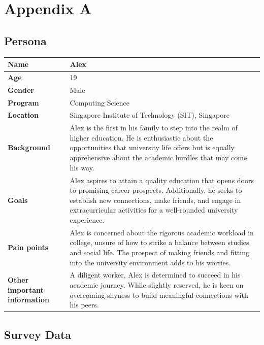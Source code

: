 \chapter{Appendix A}\label{appendix_a}

\section{Persona}\label{persona}

\begin{center}
\begin{longtable}{|l|p{10cm}|}
\hline
\textbf{Name} & Alex \\
\hline
\textbf{Age} & 19 \\
\hline
\textbf{Gender} & Male \\
\hline
\textbf{Program} & Computing Science \\
\hline
\textbf{Location} & Singapore Institute of Technology (SIT), Singapore\\
\hline
\textbf{Background} & Alex is the first in his family to step into the realm of higher education. He is enthusiastic about the opportunities that university life offers but is equally apprehensive about the academic hurdles that may come his way. \\
\hline
\textbf{Goals} & Alex aspires to attain a quality education that opens doors to promising career prospects. Additionally, he seeks to establish new connections, make friends, and engage in extracurricular activities for a well-rounded university experience. \\
\hline
\textbf{Pain points} & Alex is concerned about the rigorous academic workload in college, unsure of how to strike a balance between studies and social life. The prospect of making friends and fitting into the university environment adds to his worries. \\
\hline
\textbf{Other important information} & A diligent worker, Alex is determined to succeed in his academic journey. While slightly reserved, he is keen on overcoming shyness to build meaningful connections with his peers. \\
\hline
\end{longtable}
\end{center}


\section{Survey Data}\label{survey_data}

